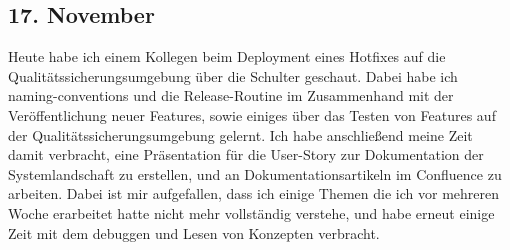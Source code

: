 \subsection{17. November}
Heute habe ich einem Kollegen beim Deployment eines Hotfixes auf die Qualitätssicherungsumgebung über die Schulter geschaut. Dabei habe ich naming-conventions und die Release-Routine im Zusammenhand mit der Veröffentlichung neuer Features, sowie einiges über das Testen von Features auf der Qualitätssicherungsumgebung gelernt. Ich habe anschließend meine Zeit damit verbracht, eine Präsentation für die User-Story zur Dokumentation der Systemlandschaft zu erstellen, und an Dokumentationsartikeln im Confluence zu arbeiten. Dabei ist mir aufgefallen, dass ich einige Themen die ich vor mehreren Woche erarbeitet hatte nicht mehr vollständig verstehe, und habe erneut einige Zeit mit dem debuggen und Lesen von Konzepten verbracht.